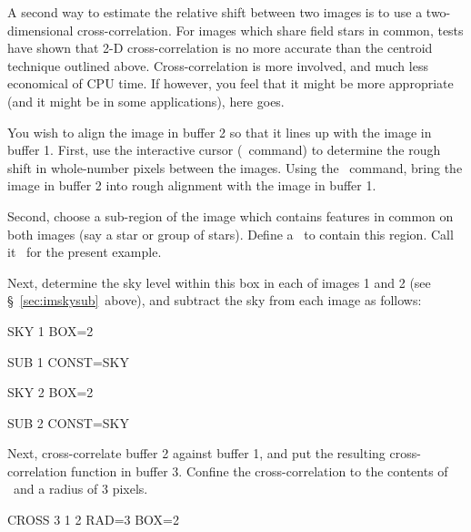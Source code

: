 A second way to estimate the relative shift between two images is to use a
two-dimensional cross-correlation.  For images which share field stars in
common, tests have shown that 2-D cross-correlation is no more accurate than
the centroid technique outlined above.  Cross-correlation is more involved,
and much less economical of CPU time.  If however, you feel that it might
be more appropriate (and it might be in some applications), here goes.  

You wish to align the image in buffer 2 so that it lines up with the image in
buffer 1.  First, use the interactive cursor (\ command) to determine
the rough shift in whole-number pixels between the images.  Using the
\ command, bring the image in buffer 2 into rough alignment with
the image in buffer 1. 

Second, choose a sub-region of the image which contains features in
common on both images (say a star or group of stars).  Define a
\ to contain this region.  Call it \ for the
present example.

Next, determine the sky level within this box in each of images 1 and 2 
(see \S~\ref{sec:imskysub}\ above), and subtract the sky from each image as
follows: 
\begin{command}
      \item SKY 1 BOX=2
      \item SUB 1 CONST=SKY
      \item SKY 2 BOX=2
      \item SUB 2 CONST=SKY
\end{command}

Next, cross-correlate buffer 2 against buffer 1, and put the resulting
cross-correlation function in buffer 3.  Confine the cross-correlation
to the contents of \ and a radius of 3 pixels.
\begin{command}
      \item CROSS 3 1 2 RAD=3 BOX=2
\end{command}

